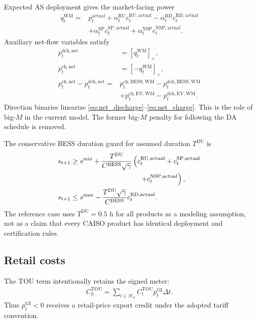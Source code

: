 \documentclass[final,5p,times]{elsarticle}
\newcommand{\dt}{\Delta t}
\newcommand{\EV}{\mathrm{EV}}
\newcommand{\BESS}{\mathrm{BESS}}
\newcommand{\GI}{\mathrm{GI}}
\newcommand{\TOU}{\mathrm{TOU}}
\newcommand{\RU}{\mathrm{RU}}
\newcommand{\RD}{\mathrm{RD}}
\newcommand{\SP}{\mathrm{SP}}
\newcommand{\NSP}{\mathrm{NSP}}
\newcommand{\WM}{\mathrm{WM}}
\newcommand{\net}{\mathrm{net}}
\newcommand{\ch}{\mathrm{ch}}
\newcommand{\dch}{\mathrm{dch}}
\newcommand{\actual}{\mathrm{actual}}
\newcommand{\calH}{\mathcal{H}}
\newcommand{\pos}[1]{\left[#1\right]_{+}}
\begin{document}
Expected AS deployment gives the market-facing power
\begin{align}
q_t^{\WM}={}&p_t^{\actual}
+\alpha_t^{\RU}c_t^{\RU,\actual}
-\alpha_t^{\RD}c_t^{\RD,\actual}\nonumber\\
&+\alpha_t^{\SP}c_t^{\SP,\actual}
+\alpha_t^{\NSP}c_t^{\NSP,\actual}. \label{eq:qwm}
\end{align}
Auxiliary net-flow variables satisfy
\begin{align}
p_t^{\dch,\net}&=\pos{q_t^{\WM}}, \label{eq:net_discharge}\\
p_t^{\ch,\net}&=\pos{-q_t^{\WM}}, \label{eq:net_charge}\\
p_t^{\ch,\net}-p_t^{\dch,\net}
={}&p_t^{\ch,\BESS,\WM}-p_t^{\dch,\BESS,\WM}\nonumber\\
&+p_t^{\ch,\EV,\WM}-p_t^{\dch,\EV,\WM}. \label{eq:net_link}
\end{align}
Direction binaries linearize \eqref{eq:net_discharge}--\eqref{eq:net_charge}. This is the role of
big-$M$ in the current model. The former big-$M$ penalty for following the DA
schedule is removed.

The conservative BESS duration guard for assumed duration $T^{\mathrm{DU}}$ is
\begin{align}
s_{t+1}&\ge s^{\min}
+\frac{T^{\mathrm{DU}}}{C^{\BESS}\sqrt{\gamma}}
\left(c_t^{\RU,\actual}+c_t^{\SP,\actual}\right.\nonumber\\
&\hspace{35mm}\left.+c_t^{\NSP,\actual}\right), \label{eq:duration_up}\\
s_{t+1}&\le s^{\max}
-\frac{T^{\mathrm{DU}}\sqrt{\gamma}}{C^{\BESS}}
c_t^{\RD,\actual}. \label{eq:duration_down}
\end{align}
The reference case uses $T^{\mathrm{DU}}=0.5$ h for all products as a modeling
assumption, not as a claim that every CAISO product has identical deployment
and certification rules.

\subsection{Retail costs}
The TOU term intentionally retains the signed meter:
\begin{align}
C_k^{\TOU}
=\sum_{t\in\calH_k}C_t^{\TOU}p_t^{\GI}\dt. \label{eq:tou}
\end{align}
Thus $p_t^{\GI}<0$ receives a retail-price export credit under the adopted
tariff convention.
\end{document}
